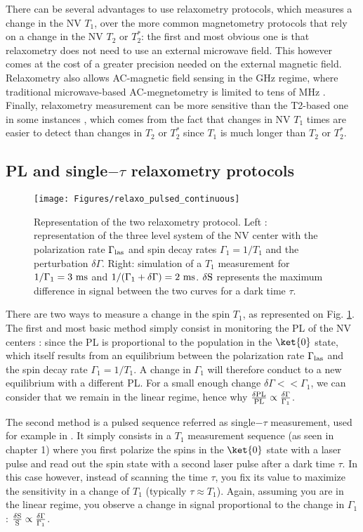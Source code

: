 \documentclass[a4paper]{report}
\begin{document}
There can be several advantages to use relaxometry protocols, which measures a change in the NV $T_1$, over the more common magnetometry protocols that rely on a change in the NV $T_2$ or $T_2^*$: the first and most obvious one is that relaxometry does not need to use an external microwave field. This however comes at the cost of a greater precision needed on the external magnetic field. Relaxometry also allows AC-magnetic field sensing in the GHz regime, where traditional microwave-based AC-megnetometry is limited to tens of MHz \citep{wang2022picotesla, alsid2022solid}. Finally, relaxometry measurement can be more sensitive than the T2-based one in some instances \citep{steinert2013magnetic}, which comes from the fact that changes in NV $T_1$ times are easier to detect than changes in $T_2$ or $T_2^*$ since $T_1$ is much longer than $T_2$ or $T_2^*$.

\subsection{PL and single$-\tau$ relaxometry protocols}
\begin{figure}[h]
\centering
\texttt{[image: Figures/relaxo\_pulsed\_continuous]}
\caption{Representation of the two relaxometry protocol. Left : representation of the three level system of the NV center with the polarization rate $\Gamma_{\rm las}$ and spin decay rates $\Gamma_1=1/T_1$ and the perturbation $\delta \Gamma$. Right: simulation of a $T_1$ measurement for $1/\Gamma_1=3\ \rm ms$ and $1/(\Gamma_1+\delta \Gamma)=2\ \rm ms$. $\delta \rm S$ represents the maximum difference in signal between the two curves for a dark time $\tau$.}
\label{T1 vs PL}
\end{figure}

There are two ways to measure a change in the spin $T_1$, as represented on Fig. \ref{T1 vs PL}. The first and most basic method simply consist in monitoring the PL of the NV centers : since the PL is proportional to the population in the $\ket{0}$ state, which itself results from an equilibrium between the polarization rate $\Gamma_{\rm las}$ and the spin decay rate $\Gamma_1=1/T_1$. A change in $\Gamma_1$ will therefore conduct to a new equilibrium with a different PL. For a small enough change $\delta \Gamma << \Gamma_1$, we can consider that we remain in the linear regime, hence why $\frac{\delta \rm PL}{\rm PL} \propto \frac{\delta \Gamma}{\Gamma_1}$.

The second method is a pulsed sequence referred as single$-\tau$ measurement, used for example in \citep{pelliccione2014two, schmid2015relaxometry, tetienne2016scanning}. It simply consists in a $T_1$ measurement sequence (as seen in chapter 1) where you first polarize the spins in the $\ket{0}$ state with a laser pulse and read out the spin state with a second laser pulse after a dark time $\tau$. In this case however, instead of scanning the time $\tau$, you fix its value to maximize the sensitivity in a change of $T_1$ (typically $\tau \approx T_1$). Again, assuming you are in the linear regime, you observe a change in signal proportional to the change in $\Gamma_1$ : $\frac{\delta \rm S}{\rm S} \propto \frac{\delta \Gamma}{\Gamma_1}$.
\end{document}
